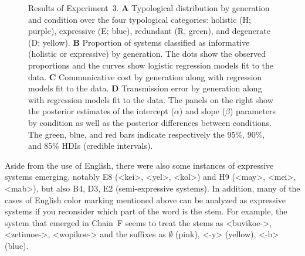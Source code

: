 \documentclass[doc,biblatex]{apa7}
\begin{document}
	\begin{figure}
	\vspace*{2pt}
	\caption{Results of Experiment~3. \textbf{A} Typological distribution by generation and condition over the four typological categories: holistic (H; purple), expressive (E; blue), redundant (R, green), and degenerate (D; yellow). \textbf{B} Proportion of systems classified as informative (holistic or expressive) by generation. The dots show the observed proportions and the curves show logistic regression models fit to the data. \textbf{C} Communicative cost by generation along with regression models fit to the data. \textbf{D} Transmission error by generation along with regression models fit to the data. The panels on the right show the posterior estimates of the intercept ($\alpha$) and slope ($\beta$) parameters by condition as well as the posterior differences between conditions. The green, blue, and red bars indicate respectively the 95\%, 90\%, and 85\% HDIs (credible intervals).}
	\label{supp3}
	\end{figure}

Aside from the use of English, there were also some instances of expressive systems emerging, notably E8 (<kei>, <yel>, <kol>) and H9 (<may>, <mei>, <mab>), but also B4, D3, E2 (semi-expressive systems). In addition, many of the cases of English color marking mentioned above can be analyzed as expressive systems if you reconsider which part of the word is the stem. For example, the system that emerged in Chain~F seems to treat the stems as <buvikoe->, <zetimoe->, <wopikoe-> and the suffixes as $\emptyset$ (pink), <-y> (yellow), <-b> (blue).
\end{document}
